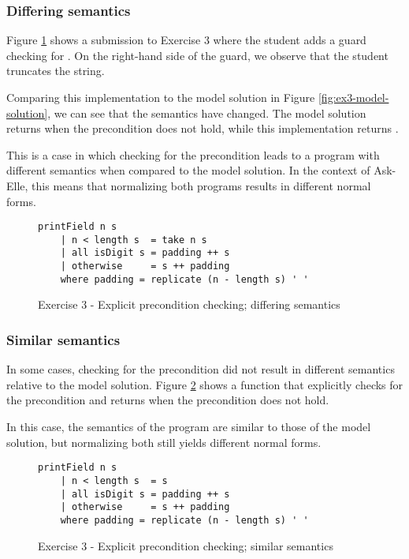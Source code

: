 \subsubsection{Differing semantics}

Figure \ref{fig:analysis-precondition-example} shows a submission to Exercise 3 where the student adds a guard checking for . On the right-hand side of the guard, we observe that the student truncates the string.

Comparing this implementation to the model solution in Figure \ref{fig:ex3-model-solution}, we can see that the semantics have changed. The model solution returns  when the precondition does not hold, while this implementation returns .

This is a case in which checking for the precondition leads to a program with different semantics when compared to the model solution. In the context of Ask-Elle, this means that normalizing both programs  results in different normal forms.

\begin{figure}
\centering
\begin{verbatim}
printField n s
    | n < length s  = take n s
    | all isDigit s = padding ++ s
    | otherwise     = s ++ padding
    where padding = replicate (n - length s) ' '
\end{verbatim}
\caption{Exercise 3 - Explicit precondition checking; differing semantics}
\label{fig:analysis-precondition-example}
\end{figure}

\subsubsection{Similar semantics}

In some cases, checking for the precondition did not result in different semantics relative to the model solution. Figure \ref{fig:analysis-precondition-similar-semantics} shows a function that explicitly checks for the precondition and returns  when the precondition does not hold.

In this case, the semantics of the program are similar to those of the model solution, but normalizing both still yields different normal forms.

\begin{figure}
\centering
\begin{verbatim}
printField n s
    | n < length s  = s
    | all isDigit s = padding ++ s
    | otherwise     = s ++ padding
    where padding = replicate (n - length s) ' '
\end{verbatim}
\caption{Exercise 3 - Explicit precondition checking; similar semantics}
\label{fig:analysis-precondition-similar-semantics}
\end{figure}

